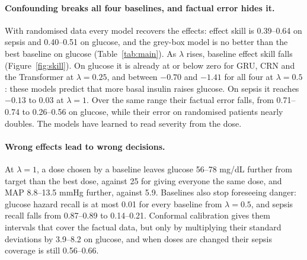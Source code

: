 \documentclass[letterpaper]{article}
\begin{document}
\begin{table}[t]
\centering

\caption{Our model is in bold. Effect skill under randomised ($\lambda=0$) and fully confounded ($\lambda=1$) training data, and the other metrics at $\lambda=1$. Arrows show which direction is better. ``+ fine-tuned'' is the baseline above it after fine-tuning on the 100 randomised trajectories. CF and factual RMSE are normalised, and factual RMSE uses the same horizon as the counterfactual metrics. Regret: how much further from target the model's chosen dose lands than the best dose; the fixed-dose regret is the bar to beat. CF cov.: worst coverage of 90\% intervals when doses are changed. All values are after calibration.}
\label{tab:main}
\end{table}

\paragraph{Confounding breaks all four baselines, and factual error hides it.} With randomised data every model recovers the effects: effect skill is 0.39--0.64 on sepsis and 0.40--0.51 on glucose, and the grey-box model is no better than the best baseline on glucose (Table~\ref{tab:main}). As $\lambda$ rises, baseline effect skill falls (Figure~\ref{fig:skill}). On glucose it is already at or below zero for GRU, CRN and the Transformer at $\lambda=0.25$, and between $-0.70$ and $-1.41$ for all four at $\lambda=0.5$: these models predict that more basal insulin raises glucose. On sepsis it reaches $-0.13$ to $0.03$ at $\lambda=1$. Over the same range their factual error falls, from 0.71--0.74 to 0.26--0.56 on glucose, while their error on randomised patients nearly doubles. The models have learned to read severity from the dose.

\paragraph{Wrong effects lead to wrong decisions.} At $\lambda=1$, a dose chosen by a baseline leaves glucose 56--78 mg/dL further from target than the best dose, against 25 for giving everyone the same dose, and MAP 8.8--13.5 mmHg further, against 5.9. Baselines also stop foreseeing danger: glucose hazard recall is at most 0.01 for every baseline from $\lambda=0.5$, and sepsis recall falls from 0.87--0.89 to 0.14--0.21. Conformal calibration gives them intervals that cover the factual data, but only by multiplying their standard deviations by 3.9--8.2 on glucose, and when doses are changed their sepsis coverage is still 0.56--0.66.
\end{document}
